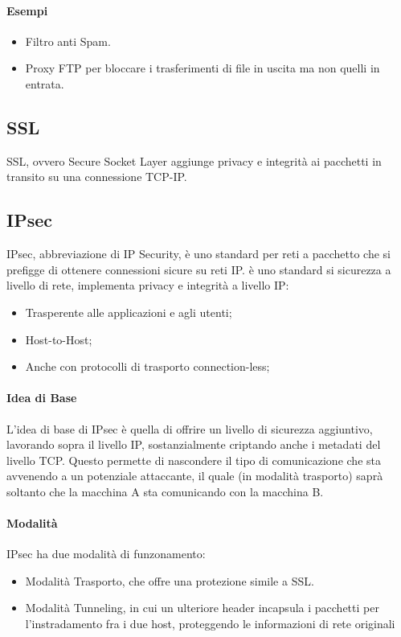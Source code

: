\documentclass[12pt, a4paper, openany]{book}
\begin{document}
\paragraph*{Esempi}
\begin{itemize}
    \item Filtro anti Spam.
    \item Proxy FTP per bloccare i trasferimenti di file in uscita ma non quelli in entrata.
\end{itemize}

\subsection{SSL}
SSL, ovvero Secure Socket Layer aggiunge privacy e integrità ai pacchetti in transito su una connessione TCP-IP.


\subsection{IPsec}
IPsec, abbreviazione di IP Security, è uno standard per reti a pacchetto che si prefigge di ottenere connessioni sicure su reti IP.
è uno standard si sicurezza a livello di rete, implementa privacy e integrità a livello IP:
\begin{itemize}
    \item Trasperente alle applicazioni e agli utenti;
    \item Host-to-Host;
    \item Anche con protocolli di trasporto connection-less;
\end{itemize}

\paragraph*{Idea di Base}
L'idea di base di IPsec è quella di offrire un livello di sicurezza aggiuntivo, lavorando sopra il livello IP, sostanzialmente criptando anche i metadati del livello TCP.
Questo permette di nascondere il tipo di comunicazione che sta avvenendo a un potenziale attaccante, il quale (in modalità trasporto) saprà soltanto che la macchina A sta comunicando con la macchina B.

\paragraph*{Modalità}
IPsec ha due modalità di funzonamento:
\begin{itemize}
    \item Modalità Trasporto, che offre una protezione simile a SSL.
    \item Modalità Tunneling, in cui un ulteriore header incapsula i pacchetti per l'instradamento fra i due host, proteggendo le informazioni di rete originali 
\end{itemize}
\end{document}
